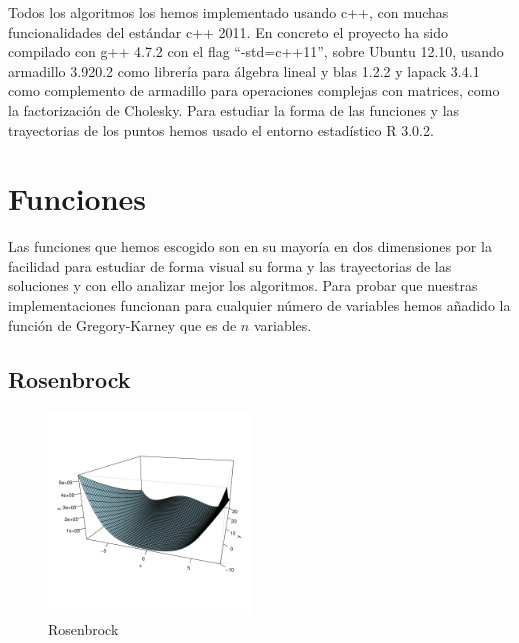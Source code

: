 \documentclass[10pt]{article}
\theoremstyle{definition}
\begin{document}
Todos los algoritmos los hemos implementado usando c++, con muchas funcionalidades del estándar c++ 2011. En concreto el proyecto ha sido compilado con g++ 4.7.2 con el flag ``-std=c++11'', sobre Ubuntu 12.10, usando armadillo 3.920.2 como librería para álgebra lineal y blas 1.2.2 y lapack 3.4.1 como complemento de armadillo para operaciones complejas con matrices, como la factorización de Cholesky. Para estudiar la forma de las funciones y las trayectorias de los puntos hemos usado el entorno estadístico R 3.0.2.


\section{Funciones} \label{sec:funciones}

Las funciones que hemos escogido son en su mayoría en dos dimensiones por la facilidad para estudiar de forma visual su forma y las trayectorias de las soluciones y con ello analizar mejor los algoritmos. Para probar que nuestras implementaciones funcionan para cualquier número de variables hemos añadido la función de Gregory-Karney que es de $n$ variables.

\subsection{Rosenbrock}\label{sub:fun-rosenbrock}

\begin{figure}
  \vspace{-70pt}
  \begin{center}
    \includegraphics[width=0.48\textwidth]{../theoretic_study/func_rosenbrock/rosenbrock.pdf}
  \end{center}
  \vspace{-50pt}
  \caption{Rosenbrock}
  \vspace{-10pt}
\end{figure}
\end{document}
